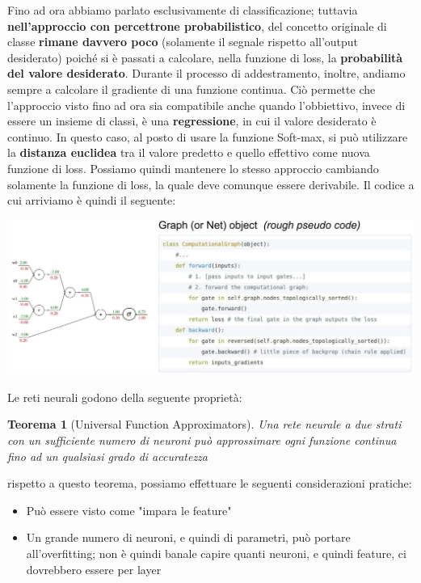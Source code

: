 \documentclass[12pt]{article}
\newtheorem{Teorema}{Teorema}[subsection]
\begin{document}
Fino ad ora abbiamo parlato esclusivamente di classificazione; tuttavia \textbf{nell'approccio con percettrone probabilistico}, del concetto originale di classe \textbf{rimane davvero poco} (solamente il segnale rispetto all'output desiderato) poiché si è passati
a calcolare, nella funzione di loss, la \textbf{probabilità del valore desiderato}. Durante il processo di addestramento, inoltre, andiamo sempre a calcolare il gradiente di una funzione continua.
Ciò permette che l'approccio visto fino ad ora sia compatibile anche quando l'obbiettivo, invece di essere un insieme di classi, è una \textbf{regressione}, in cui il valore desiderato è continuo.
In questo caso, al posto di usare la funzione Soft-max, si può utilizzare la \textbf{distanza euclidea} tra il valore predetto e quello effettivo come nuova funzione di loss.
Possiamo quindi mantenere lo stesso approccio cambiando solamente la funzione di loss, la quale deve comunque essere derivabile.
Il codice a cui arriviamo è quindi il seguente:
\begin{center}
    \includegraphics[width =1\linewidth]{Images/130.PNG}
\end{center}
Le reti neurali godono della seguente proprietà:
\begin{Teorema}[Universal Function Approximators]
    Una rete neurale a due strati con un sufficiente numero di neuroni può approssimare ogni funzione continua fino ad un qualsiasi grado di accuratezza
\end{Teorema}
rispetto a questo teorema, possiamo effettuare le seguenti considerazioni pratiche:
\begin{itemize}
    \item Può essere visto come "impara le feature"
    \item Un grande numero di neuroni, e quindi di parametri, può portare all'overfitting; non è quindi banale capire quanti neuroni, e quindi feature, ci dovrebbero essere per layer
\end{itemize}

\end{document}
